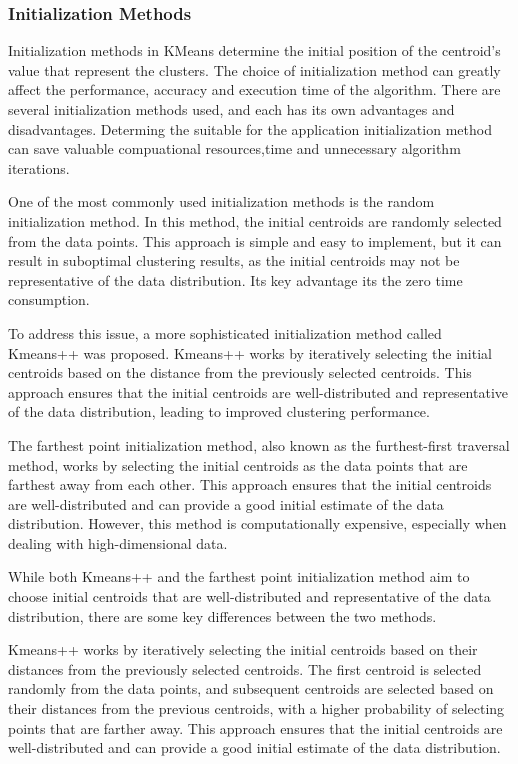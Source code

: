 \documentclass{article}
\begin{document}
{                \subsubsection{Initialization Methods}
                \hspace*{0.5cm}Initialization methods in KMeans determine the initial position of the centroid's value that represent the clusters. The choice of initialization method can greatly affect the performance, accuracy and execution time of the algorithm. There are several initialization methods used, and each has its own advantages and disadvantages. Determing the suitable for the application initialization method can save valuable compuational resources,time and unnecessary algorithm iterations.\par
                One of the most commonly used initialization methods is the random initialization method. In this method, the initial centroids are randomly selected from the data points. This approach is simple and easy to implement, but it can result in suboptimal clustering results, as the initial centroids may not be representative of the data distribution. Its key advantage its the zero time consumption.\par
                To address this issue, a more sophisticated initialization method called Kmeans++ was proposed. Kmeans++ works by iteratively selecting the initial centroids based on the distance from the previously selected centroids. This approach ensures that the initial centroids are well-distributed and representative of the data distribution, leading to improved clustering performance.\par
                The farthest point initialization method, also known as the furthest-first traversal method, works by selecting the initial centroids as the data points that are farthest away from each other. This approach ensures that the initial centroids are well-distributed and can provide a good initial estimate of the data distribution. However, this method is computationally expensive, especially when dealing with high-dimensional data.\par
                While both Kmeans++ and the farthest point initialization method aim to choose initial centroids that are well-distributed and representative of the data distribution, there are some key differences between the two methods.\par
                Kmeans++ works by iteratively selecting the initial centroids based on their distances from the previously selected centroids. The first centroid is selected randomly from the data points, and subsequent centroids are selected based on their distances from the previous centroids, with a higher probability of selecting points that are farther away. This approach ensures that the initial centroids are well-distributed and can provide a good initial estimate of the data distribution.\par
}
\end{document}
